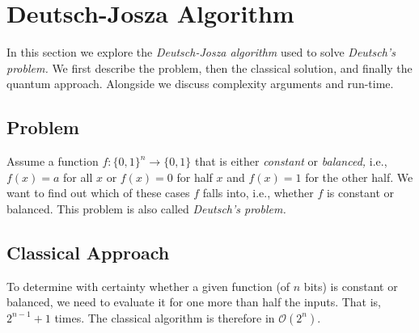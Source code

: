 	\section{Deutsch-Josza Algorithm}
		\label{sec:deutschJosza}

		In this section we explore the \emph{Deutsch-Josza algorithm} used to solve \emph{Deutsch's problem.} We first describe the problem, then the classical solution, and finally the quantum approach. Alongside we discuss complexity arguments and run-time.

		\subsection{Problem}
			Assume a function \( f : \{ 0, 1 \}^n \to \{ 0, 1 \} \) that is either \emph{constant} or \emph{balanced,} i.e., \( f(x) = a \) for all \(x\) or \( f(x) = 0 \) for half \(x\) and \( f(x) = 1 \) for the other half. We want to find out which of these cases \(f\) falls into, i.e., whether \(f\) is constant or balanced. This problem is also called \emph{Deutsch's problem.}

		\subsection{Classical Approach}
			To determine with certainty whether a given function (of \(n\) bits) is constant or balanced, we need to evaluate it for one more than half the inputs. That is, \( 2^{n - 1} + 1 \) times. The classical algorithm is therefore in \( \mathcal{O}(2^n) \).

